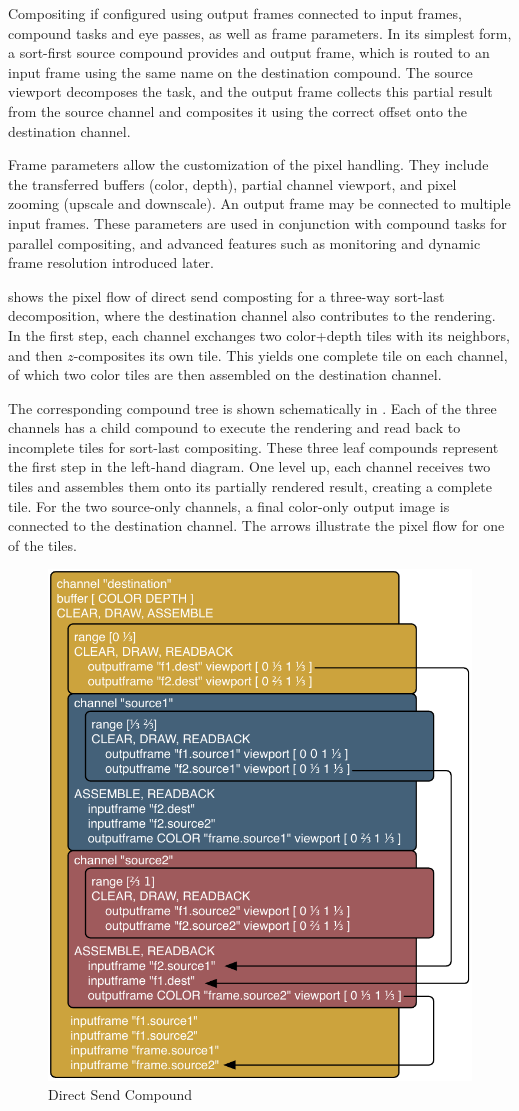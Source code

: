 Compositing if configured using output frames connected to input frames,
compound tasks and eye passes, as well as frame parameters. In its simplest
form, a sort-first source compound provides and output frame, which is routed to
an input frame using the same name on the destination compound. The source
viewport decomposes the task, and the output frame collects this partial result
from the source channel and composites it using the correct offset onto the
destination channel.

Frame parameters allow the customization of the pixel handling. They include the
transferred buffers (color, depth), partial channel viewport, and pixel zooming
(upscale and downscale). An output frame may be connected to multiple input
frames. These parameters are used in conjunction with compound tasks for
parallel compositing, and advanced features such as monitoring and dynamic frame
resolution introduced later.

 shows the pixel flow of direct send composting for a three-way
sort-last decomposition, where the destination channel also contributes to the
rendering. In the first step, each channel exchanges two color+depth tiles with
its neighbors, and then $z$-composites its own tile. This yields one complete
tile on each channel, of which two color tiles are then assembled on the
destination channel.

The corresponding compound tree is shown schematically in .
Each of the three channels has a child compound to execute the rendering and
read back to incomplete tiles for sort-last compositing. These three leaf
compounds represent the first step in the left-hand diagram. One level up, each
channel receives two tiles and assembles them onto its partially rendered
result, creating a complete tile. For the two source-only channels, a final
color-only output image is connected to the destination channel. The arrows
illustrate the pixel flow for one of the tiles.

\begin{figure}
  \includegraphics[width=.618\textwidth]{images/directSendCompound}
  {\caption{\label{fDirectSendCmp}Direct Send Compound}}
\end{figure}

